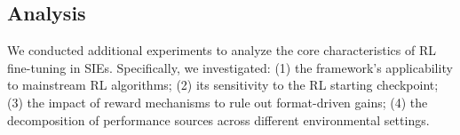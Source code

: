 \documentclass{article} %
\begin{document}
\begin{table}[!t]
\centering
\caption{Reasoning generalization performance of Qwen2.5-7B-Instruct after RL fine-tuning in partial SIEs. The red numbers in parentheses show the performance improvement relative to the initial CoT baseline after being trained with the corresponding RL w/ SIE.}
\vspace{-5pt}
\label{tab:qwen_math_performance}
\end{table}






\subsection{Analysis}
We conducted additional experiments to analyze the core characteristics of RL fine-tuning in SIEs. Specifically, we investigated: (1) the framework's applicability to mainstream RL algorithms; (2) its sensitivity to the RL starting checkpoint; (3) the impact of reward mechanisms to rule out format-driven gains; (4) the decomposition of performance sources across different environmental settings.  
\end{document}
